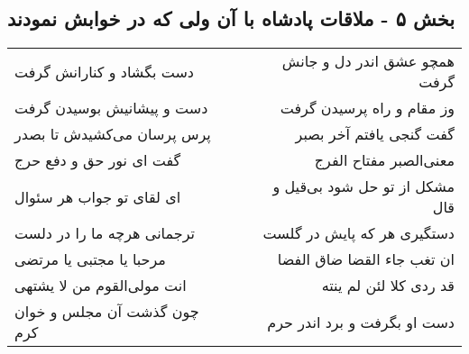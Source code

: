 \begin{center}
\section*{بخش ۵ - ملاقات پادشاه با آن ولی که در خوابش نمودند}
\label{sec:sh005}
\begin{longtable}{l p{0.5cm} r}
دست بگشاد و کنارانش گرفت
&&
همچو عشق اندر دل و جانش گرفت
\\
دست و پیشانیش بوسیدن گرفت
&&
وز مقام و راه پرسیدن گرفت
\\
پرس پرسان می‌کشیدش تا بصدر
&&
گفت گنجی یافتم آخر بصبر
\\
گفت ای نور حق و دفع حرج
&&
معنی‌الصبر مفتاح الفرج
\\
ای لقای تو جواب هر سئوال
&&
مشکل از تو حل شود بی‌قیل و قال
\\
ترجمانی هرچه ما را در دلست
&&
دستگیری هر که پایش در گلست
\\
مرحبا یا مجتبی یا مرتضی
&&
ان تغب جاء القضا ضاق الفضا
\\
انت مولی‌القوم من لا یشتهی
&&
قد ردی کلا لئن لم ینته
\\
چون گذشت آن مجلس و خوان کرم
&&
دست او بگرفت و برد اندر حرم
\\
\end{longtable}
\end{center}
